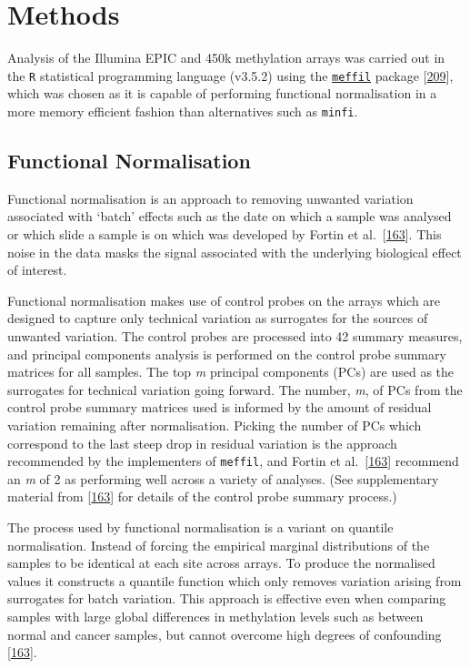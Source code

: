 \documentclass[
]{book}
\begin{document}
\hypertarget{methods-1}{%
\section{Methods}\label{methods-1}}

Analysis of the Illumina EPIC and 450k methylation arrays was carried out in the \texttt{R} statistical programming language (v3.5.2) using the \href{https://github.com/perishky/meffil/wiki}{\texttt{meffil}} package {[}\protect\hyperlink{ref-Min2017}{209}{]}, which was chosen as it is capable of performing functional normalisation in a more memory efficient fashion than alternatives such as \texttt{minfi}.

\hypertarget{functional-normalisation}{%
\subsection{Functional Normalisation}\label{functional-normalisation}}

Functional normalisation is an approach to removing unwanted variation associated with `batch' effects such as the date on which a sample was analysed or which slide a sample is on which was developed by Fortin et al.~{[}\protect\hyperlink{ref-Fortin2014}{163}{]}.
This noise in the data masks the signal associated with the underlying biological effect of interest.

Functional normalisation makes use of control probes on the arrays which are designed to capture only technical variation as surrogates for the sources of unwanted variation.
The control probes are processed into 42 summary measures, and principal components analysis is performed on the control probe summary matrices for all samples.
The top \emph{m} principal components (PCs) are used as the surrogates for technical variation going forward.
The number, \emph{m}, of PCs from the control probe summary matrices used is informed by the amount of residual variation remaining after normalisation.
Picking the number of PCs which correspond to the last steep drop in residual variation is the approach recommended by the implementers of \texttt{meffil}, and Fortin et al.~{[}\protect\hyperlink{ref-Fortin2014}{163}{]} recommend an \emph{m} of 2 as performing well across a variety of analyses.
(See supplementary material from {[}\protect\hyperlink{ref-Fortin2014}{163}{]} for details of the control probe summary process.)

The process used by functional normalisation is a variant on quantile normalisation.
Instead of forcing the empirical marginal distributions of the samples to be identical at each site across arrays. To produce the normalised values it constructs a quantile function which only removes variation arising from surrogates for batch variation.
This approach is effective even when comparing samples with large global differences in methylation levels such as between normal and cancer samples, but cannot overcome high degrees of confounding {[}\protect\hyperlink{ref-Fortin2014}{163}{]}.
\end{document}
